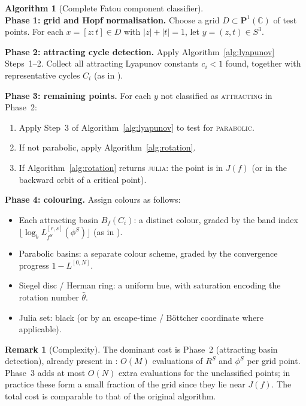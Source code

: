 \documentclass[12pt]{article}
\theoremstyle{definition}
\newtheorem{remark}[theorem]{Remark}
\newtheorem{algorithm_desc}[theorem]{Algorithm}
\newcommand{\C}{\mathbb{C}}
\newcommand{\Pone}{\mathbf{P}^1(\C)}
\newcommand{\RS}{R^S}
\begin{document}
\begin{algorithm_desc}[Complete Fatou component classifier]
  \label{alg:full}
  \quad\\
  \textbf{Phase 1: grid and Hopf normalisation.}
  Choose a grid $D \subset \Pone$ of test points.  For each $x=[z:t]\in D$
  with $|z|+|t|=1$, let $y=(z,t)\in S^3$.

  \textbf{Phase 2: attracting cycle detection.}
  Apply Algorithm~\ref{alg:lyapunov} Steps~1--2.  Collect all attracting
  Lyapunov constants $c_i < 1$ found, together with representative cycles
  $C_i$ (as in \cite[\S4.1]{Alvarez2023}).

  \textbf{Phase 3: remaining points.}
  For each $y$ not classified as \textsc{attracting} in Phase~2:
  \begin{enumerate}[label=3.\arabic*.]
    \item Apply Step~3 of Algorithm~\ref{alg:lyapunov} to test for
          \textsc{parabolic}.
    \item If not parabolic, apply Algorithm~\ref{alg:rotation}.
    \item If Algorithm~\ref{alg:rotation} returns \textsc{julia}:
          the point is in $J(f)$ (or in the backward orbit of a critical
          point).
  \end{enumerate}

  \textbf{Phase 4: colouring.}
  Assign colours as follows:
  \begin{itemize}
    \item Each attracting basin $B_f(C_i)$: a distinct colour, graded by
          the band index $\lfloor \log_b L_{f^S}^{[r,s]}(\phi^S) \rfloor$
          (as in \cite{Alvarez2023}).
    \item Parabolic basins: a separate colour scheme, graded by the
          convergence progress $1 - L^{[0,N]}$.
    \item Siegel disc / Herman ring: a uniform hue, with saturation
          encoding the rotation number $\hat\theta$.
    \item Julia set: black (or by an escape-time / Böttcher coordinate
          where applicable).
  \end{itemize}
\end{algorithm_desc}

\begin{remark}[Complexity]
  The dominant cost is Phase~2 (attracting basin detection), already
  present in \cite{Alvarez2023}: $O(M)$ evaluations of $\RS$ and $\phi^S$
  per grid point.  Phase~3 adds at most $O(N)$ extra evaluations for the
  unclassified points; in practice these form a small fraction of the grid
  since they lie near $J(f)$.  The total cost is comparable to that of the
  original algorithm.
\end{remark}
\end{document}
